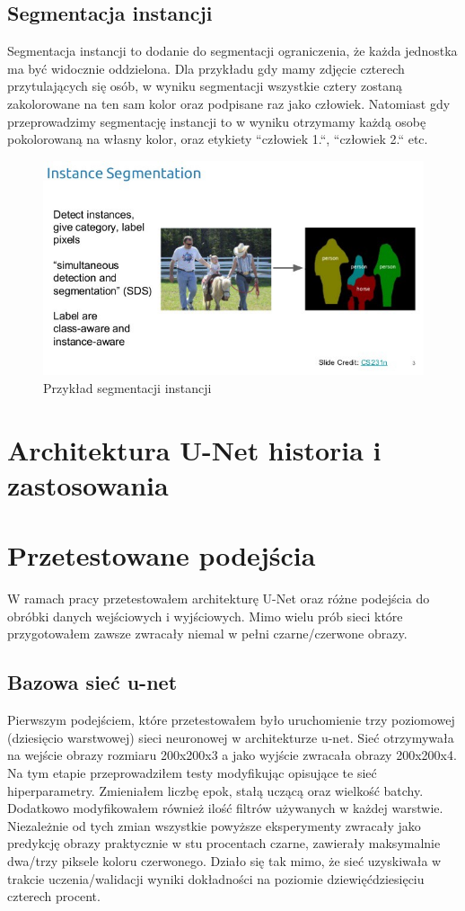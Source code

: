 \documentclass{article}
\begin{document}
\subsection{Segmentacja instancji}
Segmentacja instancji to dodanie do segmentacji ograniczenia, że każda jednostka ma być widocznie oddzielona.
Dla przykładu gdy mamy zdjęcie czterech przytulających się osób, w wyniku segmentacji wszystkie cztery zostaną zakolorowane na ten sam kolor oraz podpisane raz jako człowiek.
Natomiast gdy przeprowadzimy segmentację instancji to w wyniku otrzymamy każdą osobę pokolorowaną na własny kolor, oraz etykiety ``człowiek 1.``, ``człowiek 2.`` etc.
\begin{figure}[h!]
  \centering
  \includegraphics[width=\linewidth]{images/segmentacja_instancji.jpeg}
  \caption{Przykład segmentacji instancji}
  \label{fig:segmentacja_instancji}
\end{figure}
\newpage
\section{Architektura U-Net historia i zastosowania}
\newpage
\section{Przetestowane podejścia}
W ramach pracy przetestowałem architekturę U-Net oraz różne podejścia do obróbki danych wejściowych i wyjściowych.
Mimo wielu prób sieci które przygotowałem zawsze zwracały niemal w pełni czarne/czerwone obrazy.
\subsection{Bazowa sieć u-net}
Pierwszym podejściem, które przetestowałem było uruchomienie trzy poziomowej (dziesięcio warstwowej) sieci neuronowej w architekturze u-net.
Sieć otrzymywała na wejście obrazy rozmiaru 200x200x3 a jako wyjście zwracała obrazy 200x200x4.
Na tym etapie przeprowadziłem testy modyfikując opisujące te sieć hiperparametry.
Zmieniałem liczbę epok, stałą uczącą oraz wielkość batchy.
Dodatkowo modyfikowałem również ilość filtrów używanych w każdej warstwie.
Niezależnie od tych zmian wszystkie powyższe eksperymenty zwracały jako predykcję obrazy praktycznie w stu procentach czarne, zawierały maksymalnie dwa/trzy piksele koloru czerwonego.
Działo się tak mimo, że sieć uzyskiwała w trakcie uczenia/walidacji wyniki dokładności na poziomie dziewięćdziesięciu czterech procent.
\end{document}
